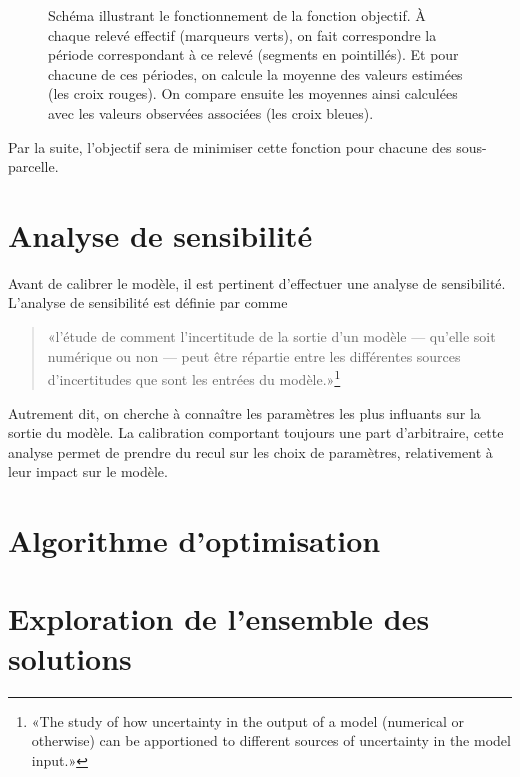\begin{figure}[ht]
\caption{Schéma illustrant le fonctionnement de la fonction objectif. À chaque relevé effectif (marqueurs verts), on fait correspondre la période correspondant à ce relevé (segments en pointillés).
Et pour chacune de ces périodes, on calcule la moyenne des valeurs estimées (les croix rouges). On compare ensuite les moyennes ainsi calculées avec les valeurs observées associées (les croix bleues).}
\label{fig:calib}
\end{figure}


Par la suite, l'objectif sera de minimiser cette fonction pour chacune des sous-parcelle.

\section{Analyse de sensibilité}

Avant de calibrer le modèle, il est pertinent d'effectuer une analyse de sensibilité.
L'analyse de sensibilité est définie par \citet{saltelli} comme
\begin{quote}
 «l'étude de comment l'incertitude de la sortie d'un modèle --- qu'elle soit numérique ou non --- peut être répartie entre les différentes sources d'incertitudes que sont les entrées du modèle.»\footnote{«The study of
how uncertainty in the output of a model (numerical or otherwise) can be
apportioned to different sources of uncertainty in the model input.»}
\end{quote}
Autrement dit, on cherche à connaître les paramètres les plus influants sur la sortie du modèle.
La calibration comportant toujours une part d'arbitraire, cette analyse permet de prendre du recul sur les choix de paramètres, relativement à leur impact sur le modèle.


\section{Algorithme d'optimisation}

\section{Exploration de l'ensemble des solutions}
